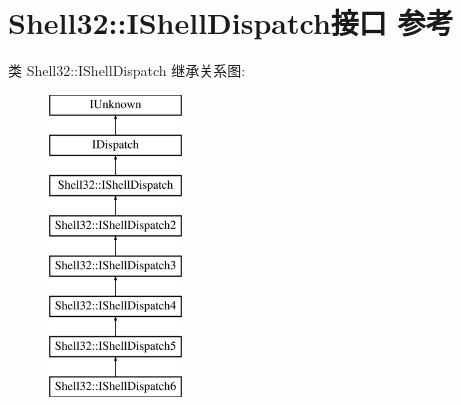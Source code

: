 \hypertarget{interface_shell32_1_1_i_shell_dispatch}{}\section{Shell32\+:\+:I\+Shell\+Dispatch接口 参考}
\label{interface_shell32_1_1_i_shell_dispatch}
类 Shell32\+:\+:I\+Shell\+Dispatch 继承关系图\+:\begin{figure}[H]
\begin{center}
\leavevmode
\includegraphics[height=8.000000cm]{interface_shell32_1_1_i_shell_dispatch}
\end{center}
\end{figure}
